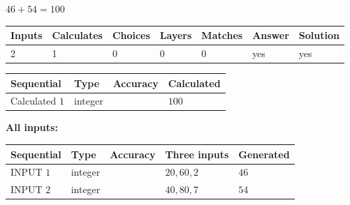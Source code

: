 \documentclass[12pt]{article}
\begin{document}
 
 
 
\noindent{}
 
 

$ %
46 +  %
54=   %
100$
 
 
\noindent{}
 
 

 
   
   
   
   
\noindent\begin{tabular}{|l|l|l|l|l|l|l|}
 \hline
Inputs & Calculates & Choices & Layers & Matches & Answer & Solution \\ \hline
 2  & 
 1  & 
 0
  & 
 0  & 
 0  & 
  yes & 
  yes 
  \\ \hline
 \end{tabular}
   
   
   
   
\noindent{}
   
   
  
  
\noindent\begin{tabular}{|l|l|l|l|}
\hline
 Sequential & Type & Accuracy & Calculated \\ 
\hline
 
 
  Calculated $  1 $ & integer &  & 
  $ 100 $ 
 \\  \hline  
 \end{tabular}
   
   
   
   
\noindent\vspace{0.1in}\hspace{-0.08in} {\textbf{\Large{All inputs: }}}
   
   
  
  
\noindent\begin{tabular}{|l|l|l|l|l|}
\hline
 Sequential & Type & Accuracy & Three inputs & Generated \\ 
\hline
 
 
  INPUT $  1 $ & integer &  & $
 20
 , 
 60
 , 
 2
 $ & $ 46 $ 
 \\  \hline  
 
 
  INPUT $  2 $ & integer &  & $
 40
 , 
 80
 , 
 7
 $ & $ 54 $ 
 \\  \hline  
 \end{tabular}
   
\end{document}
